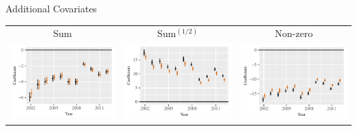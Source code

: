 \documentclass{beamer}
\begin{document}
\begin{frame}{Additional Covariates}

\centering
\begin{tabular}{c@{\hskip -.4cm}c@{\hskip -.4cm}c}
\small{Sum} & \small{Sum$^{(1/2)}$} & \small{Non-zero} \\
\includegraphics[height=.3\textheight, clip=true, trim=.5cm .5cm 0cm .1cm]{slides_figures/rl_plots/sum.pdf}    &
\includegraphics[height=.3\textheight, clip=true, trim=.5cm .5cm 0cm .1cm]{slides_figures/rl_plots/Sum_5.pdf}   &
\includegraphics[height=.3\textheight, clip=true, trim=.5cm .5cm 0cm .1cm]{slides_figures/rl_plots/nonzero.pdf}\\



\end{tabular}
\end{frame}
\end{document}
